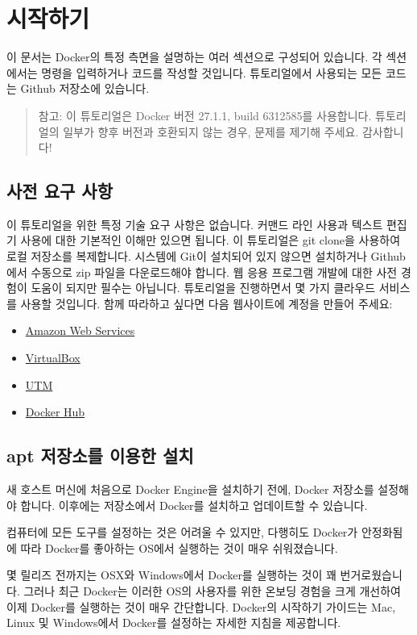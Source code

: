 \chapter{시작하기}
이 문서는 Docker의 특정 측면을 설명하는 여러 섹션으로 구성되어 있습니다. 각 섹션에서는 명령을 입력하거나 코드를 작성할 것입니다. 튜토리얼에서 사용되는 모든 코드는 Github 저장소에 있습니다.
\begin{quote}
참고: 이 튜토리얼은 Docker 버전 27.1.1, build 6312585를 사용합니다. 튜토리얼의 일부가 향후 버전과 호환되지 않는 경우, 문제를 제기해 주세요. 감사합니다!
\end{quote}

\section{사전 요구 사항}
이 튜토리얼을 위한 특정 기술 요구 사항은 없습니다. 커맨드 라인 사용과 텍스트 편집기 사용에 대한 기본적인 이해만 있으면 됩니다. 이 튜토리얼은 git clone을 사용하여 로컬 저장소를 복제합니다. 시스템에 Git이 설치되어 있지 않으면 설치하거나 Github에서 수동으로 zip 파일을 다운로드해야 합니다. 웹 응용 프로그램 개발에 대한 사전 경험이 도움이 되지만 필수는 아닙니다. 튜토리얼을 진행하면서 몇 가지 클라우드 서비스를 사용할 것입니다. 함께 따라하고 싶다면 다음 웹사이트에 계정을 만들어 주세요:
\begin{itemize}
    \item \href{http://aws.amazon.com/}{Amazon Web Services}
    \item \href{https://virtualbox.org/}{VirtualBox}
    \item \href{https://docs.getutm.app/installation/macos/}{UTM}
    \item \href{https://hub.docker.com/}{Docker Hub}
\end{itemize}

\section{apt 저장소를 이용한 설치}

새 호스트 머신에 처음으로 Docker Engine을 설치하기 전에, Docker 저장소를 설정해야 합니다. 이후에는 저장소에서 Docker를 설치하고 업데이트할 수 있습니다.

컴퓨터에 모든 도구를 설정하는 것은 어려울 수 있지만, 다행히도 Docker가 안정화됨에 따라 Docker를 좋아하는 OS에서 실행하는 것이 매우 쉬워졌습니다.

몇 릴리즈 전까지는 OSX와 Windows에서 Docker를 실행하는 것이 꽤 번거로웠습니다. 그러나 최근 Docker는 이러한 OS의 사용자를 위한 온보딩 경험을 크게 개선하여 이제 Docker를 실행하는 것이 매우 간단합니다. Docker의 시작하기 가이드는 Mac, Linux 및 Windows에서 Docker를 설정하는 자세한 지침을 제공합니다.


